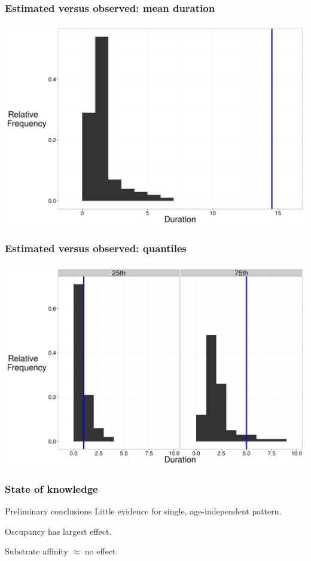 \documentclass{beamer}
\begin{document}
\begin{frame}
  \frametitle{Estimated versus observed: mean duration}
  \begin{center}
    \includegraphics[height = 0.8\textheight, width = \textwidth, keepaspectratio = true]{figure/wei_mean_ppc}
  \end{center}
\end{frame}

\begin{frame}
  \frametitle{Estimated versus observed: quantiles}
  \begin{center}
    \includegraphics[height = 0.8\textheight, width = \textwidth, keepaspectratio = true]{figure/wei_quant_ppc}
  \end{center}
\end{frame}

\begin{frame}
  \frametitle{State of knowledge}

  \begin{block}{Preliminary conclusions}
    Little evidence for single, age-independent pattern.

    Occupancy has largest effect. 
    
    Substrate affinity \(\approx\) no effect.
  \end{block}
\end{frame}
\end{document}
